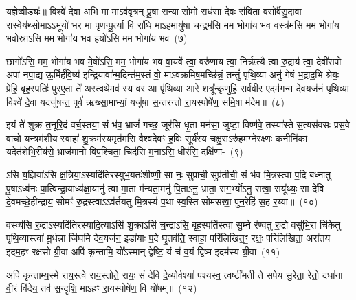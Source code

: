 य॒ज्ञेष्वीड्यः॑॥ विश्वे॑ दे॒वा अ॒भि मा मा\-ऽव॑वृत्रन् पू॒षा स॒न्या सोमो॒ राध॑सा दे॒वः स॑वि॒ता वसो᳚र्वसु॒दावा॒ रास्वेय॑थ्सो॒मा\-ऽऽ\-भूयो॑ भर॒ मा पृ॒णन्पू॒र्त्या वि रा॑धि॒ मा\-ऽहमायु॑षा च॒न्द्रम॑सि॒ मम॒ भोगा॑य भव॒ वस्त्र॑मसि॒ मम॒ भोगा॑य भवो॒स्रा\-ऽसि॒ मम॒ भोगा॑य भव॒ हयो॑\-ऽसि॒ मम॒ भोगा॑य भव॒~(७)\ip

छागो॑\-ऽसि॒ मम॒ भोगा॑य भव मे॒षो॑\-ऽसि॒ मम॒ भोगा॑य भव वा॒यवे᳚ त्वा॒ वरु॑णाय त्वा॒ निर्\mbox{}ऋ॑त्यै त्वा रु॒द्राय॑ त्वा॒ देवी॑रापो अपां नपा॒द्य ऊ॒र्मिर्\mbox{}ह॑वि॒ष्य॑ इन्द्रि॒यावा᳚न्म॒दिन्त॑म॒स्तं वो॒ मा\-ऽव॑क्रमिष॒मच्छि॑न्नं॒ तन्तुं॑ पृथि॒व्या अनु॑ गेषं भ॒द्राद॒भि श्रेयः॒ प्रेहि॒ बृह॒स्पतिः॑ पुरए॒ता ते॑ अ॒स्त्वथे॒मव॑ स्य॒ वर॒ आ पृ॑थि॒व्या आ॒रे शत्रू᳚न्कृणुहि॒ सर्व॑वीर॒ एदम॑गन्म देव॒यज॑नं पृथि॒व्या विश्वे॑ दे॒वा यदजु॑षन्त॒ पूर्व॑ ऋख्सा॒माभ्यां॒ यजु॑षा स॒न्तर॑न्तो रा॒यस्पोषे॑ण॒ समि॒षा म॑देम॥~(८)\ip

{\anuvakamend[{आ त्वꣳ हयो॑\-ऽसि॒ मम॒ भोगा॑य भव स्य॒ पञ्च॑विꣳशतिश्च}]}

इ॒यं ते॑ शुक्र त॒नूरि॒दं वर्च॒स्तया॒ सं भ॑व॒ भ्राजं॑ गच्छ॒ जूर॑सि धृ॒ता मन॑सा॒ जुष्टा॒ विष्ण॑वे॒ तस्या᳚स्ते स॒त्यस॑वसः प्रस॒वे वा॒चो य॒न्त्रम॑शीय॒ स्वाहा॑ शु॒क्रम॑स्य॒मृत॑मसि वैश्वदे॒वꣳ ह॒विः सूर्य॑स्य॒ चक्षु॒रा\-ऽरु॑हम॒ग्नेर॒क्ष्णः क॒नीनि॑कां॒ यदेत॑शेभि॒रीय॑से॒ भ्राज॑मानो विप॒श्चिता॒ चिद॑सि म॒ना\-ऽसि॒ धीर॑सि॒ दक्षि॑णा-~(९)\ip

ऽसि य॒ज्ञिया॑\-ऽसि क्ष॒त्रिया॒\-ऽस्यदि॑तिरस्युभ॒यतः॑शीर्ष्णी॒ सा नः॒ सुप्रा॑ची॒ सुप्र॑तीची॒ सं भ॑व मि॒त्रस्त्वा॑ प॒दि ब॑ध्नातु पू॒षा\-ऽध्व॑नः पा॒त्विन्द्रा॒याध्य॑क्षा॒यानु॑ त्वा मा॒ता म॑न्यता॒मनु॑ पि॒ता\-ऽनु॒ भ्राता॒ सग॒र्भ्यो\-ऽनु॒ सखा॒ सयू᳚थ्यः॒ सा दे॑वि दे॒वमच्छे॒हीन्द्रा॑य॒ सोमꣳ॑ रु॒द्रस्त्वा\-ऽऽ\-व॑र्तयतु मि॒त्रस्य॑ प॒था स्व॒स्ति सोम॑सखा॒ पुन॒रेहि॑ स॒ह र॒य्या॥~(१०)\ip

{\anuvakamend[{दक्षि॑णा॒ सोम॑सखा॒ पञ्च॑ च}]}

वस्व्य॑सि रु॒द्रा\-ऽस्यदि॑तिरस्यादि॒त्या\-ऽसि॑ शु॒क्रा\-ऽसि॑ च॒न्द्रा\-ऽसि॒ बृह॒स्पति॑स्त्वा सु॒म्ने र॑ण्वतु रु॒द्रो वसु॑भि॒रा चि॑केतु पृथि॒व्यास्त्वा॑ मू॒र्धन्ना जि॑घर्मि देव॒यज॑न॒ इडा॑याः प॒दे घृ॒तव॑ति॒ स्वाहा॒ परि॑लिखित॒ꣳ॒ रक्षः॒ परि॑लिखिता॒ अरा॑तय इ॒दम॒हꣳ रक्ष॑सो ग्री॒वा अपि॑ कृन्तामि॒ यो᳚\-ऽस्मान् द्वेष्टि॒ यं च॑ व॒यं द्वि॒ष्म इ॒दम॑स्य ग्री॒वा~(११)\ip

अपि॑ कृन्ताम्य॒स्मे राय॒स्त्वे राय॒स्तोते॒ रायः॒ सं दे॑वि दे॒व्योर्वश्या॑ पश्यस्व॒ त्वष्टी॑मती ते सपेय सु॒रेता॒ रेतो॒ दधा॑ना वी॒रं वि॑देय॒ तव॑ स॒न्दृशि॒ मा\-ऽहꣳ रा॒यस्पोषे॑ण॒ वि यो॑षम्॥~(१२)\ip

{\anuvakamend[{अ॒स्य॒ ग्री॒वा एका॒न्नत्रि॒ꣳ॒शच्च॑}]}


